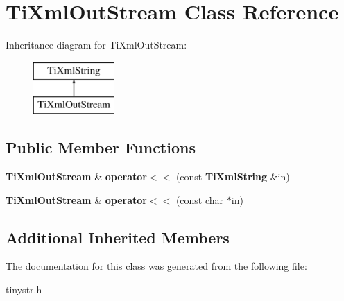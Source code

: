 \section{Ti\+Xml\+Out\+Stream Class Reference}
\label{classTiXmlOutStream}
Inheritance diagram for Ti\+Xml\+Out\+Stream\+:\begin{figure}[H]
\begin{center}
\leavevmode
\includegraphics[height=2.000000cm]{classTiXmlOutStream}
\end{center}
\end{figure}
\subsection*{Public Member Functions}
\begin{DoxyCompactItemize}
\item 
\mbox{\label{classTiXmlOutStream_a3640dcb1c0903be3bc6966cdc9a79db6}} 
\textbf{ Ti\+Xml\+Out\+Stream} \& {\bfseries operator$<$$<$} (const \textbf{ Ti\+Xml\+String} \&in)
\item 
\mbox{\label{classTiXmlOutStream_af2117e5a8cbfcb69544804ad2859bfb6}} 
\textbf{ Ti\+Xml\+Out\+Stream} \& {\bfseries operator$<$$<$} (const char $\ast$in)
\end{DoxyCompactItemize}
\subsection*{Additional Inherited Members}


The documentation for this class was generated from the following file\+:\begin{DoxyCompactItemize}
\item 
tinystr.\+h\end{DoxyCompactItemize}
